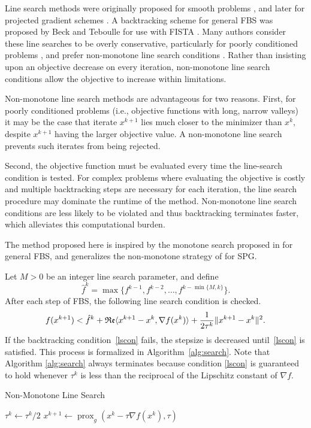 \documentclass{amsart}
\renewcommand\Re{\operatorname{\mathfrak{Re}}}
\newcommand{\eqn}[2]{\begin{equation}\label{#1}#2\end{equation}}
\newcommand{\ra}{\rangle}
\newcommand{\la}{\langle}
\newcommand{\kp}{^{k+1}}
\DeclareMathOperator{\prox}{prox}
\theoremstyle{definition}
\begin{document}
Line search methods were originally proposed for smooth problems \cite{BMDIC95}, and later for projected gradient schemes \cite{KM96,BMR00}.  A backtracking  scheme for general FBS was proposed by Beck and Teboulle for use with FISTA \cite{BT09}.  
  Many authors consider these line searches to be overly conservative, particularly for poorly conditioned problems \cite{BMR00}, and prefer non-monotone line search conditions \cite{GLL86,ZH04}.  Rather than insisting upon an objective decrease on every iteration, non-monotone line search conditions allow the objective to increase within limitations.
  
    Non-monotone line search methods are advantageous for two reasons. First, for poorly conditioned problems (i.e., objective functions with long, narrow valleys) it may be the case that iterate $x\kp$  lies much closer to the minimizer than $x^k,$ despite $x\kp$ having the larger objective value. A non-monotone line search prevents such iterates from being rejected.  


Second, the objective function must be evaluated every time the line-search condition is tested.  For complex problems where evaluating the objective is costly and multiple backtracking steps are necessary for each iteration,  the line search procedure may dominate the runtime of the method.  Non-monotone line search conditions are less likely to be violated and thus backtracking terminates faster, which alleviates this computational burden.

The method proposed here is inspired by the monotone search proposed in \cite{BT09} for general FBS, and generalizes the non-monotone strategy of \cite{GLL86} for SPG.  
    
     Let $M>0$ be an integer line search parameter, and define
  $$ \hat f^k =  \max \{ f^{k-1},f^{k-2},\dots,f^{k- \min\{M,k\} }  \} .$$
After each step of FBS, the following line search condition is checked.~\
  \eqn{lscon}{
    f(x\kp)<  \hat f^k + \Re  \la  x\kp -x^k, \nabla f(x^k) \ra\\+ \frac{1}{2\tau^k}  \| x\kp-x^k\|^2.
} 
If the backtracking condition~\eqref{lscon} fails, the stepsize is decreased until~\eqref{lscon} is satisfied. This process is formalized in Algorithm~\ref{alg:search}.   Note that Algorithm \ref{alg:search} always terminates because condition \eqref{lscon} is guaranteed to hold whenever $\tau^k$ is less than the reciprocal of the Lipschitz constant of $\nabla f.$
    
    \begin{algorithm}[t]
\caption{Non-Monotone Line Search }
\label{alg:search}
\begin{algorithmic}
\While { $x^k$ and $x\kp$ violate  condition \eqref{lscon} } 
\State $\tau^k \gets \tau^k/2$
\State $x\kp \gets   \prox_g  ( x^k-\tau \nabla f(x^k) , \tau)$
\EndWhile
\end{algorithmic}
\end{algorithm}
\end{document}
